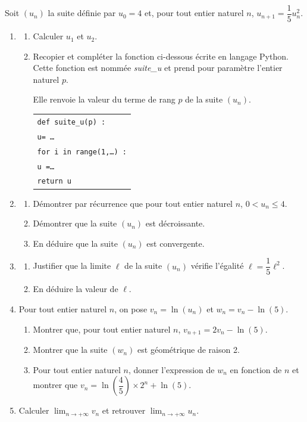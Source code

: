 \medskip

Soit $\left(u_n\right)$ la suite définie par $u_0 = 4$ et, pour tout entier naturel $n$,\: $u_{n+1} = \dfrac15 u_n^2$.

\medskip

\begin{enumerate}
\item 
	\begin{enumerate}
		\item Calculer $u_1$ et $u_2$.
		\item Recopier et compléter la fonction ci-dessous écrite en langage Python.
Cette fonction est nommée \emph{suite\_u} et prend pour paramètre l'entier naturel $p$.

Elle renvoie la valeur du terme de rang $p$ de la suite $\left(u_n\right)$.

\begin{center}
\begin{tabular}{l}
\texttt{def suite\_u(p) :}\\
	\quad \texttt{u= \ldots}\\
	\quad \texttt{for i in range(1,\ldots) :}\\
	\quad \quad \texttt{u =\ldots}\\
	\quad \texttt{return u}\\
	\end{tabular}
\end{center}

	\end{enumerate}
\item 
	\begin{enumerate}
		\item Démontrer par récurrence que pour tout entier naturel $n$,\: $0 < u_n \leqslant 4$.
		\item Démontrer que la suite $\left(u_n\right)$ est décroissante.
		\item En déduire que la suite $\left(u_n\right)$ est convergente.
	\end{enumerate}
\item 
	\begin{enumerate}
		\item Justifier que la limite $\ell$ de la suite $\left(u_n\right)$ vérifie l'égalité $\ell = \dfrac15 \ell^2$.
		\item En déduire la valeur de $\ell$.
	\end{enumerate}
\item Pour tout entier naturel $n$, on pose $v_n = \ln \left(u_n\right)$ et $w_n = v_n - \ln (5)$.
	\begin{enumerate}
		\item Montrer que, pour tout entier naturel $n$,\: $v_{n+1} = 2v_n - \ln (5)$.
		\item Montrer que la suite $\left(w_n\right)$ est géométrique de raison 2.
		\item Pour tout entier naturel $n$, donner l'expression de $w_n$ en fonction de $n$ et montrer que $v_n = \ln \left(\dfrac45 \right) \times 2^n + \ln (5)$.
	\end{enumerate}
\item Calculer $\displaystyle\lim_{n \to + \infty} v_n$ et retrouver $\displaystyle\lim_{n \to + \infty} u_n$.
\end{enumerate}

\bigskip
